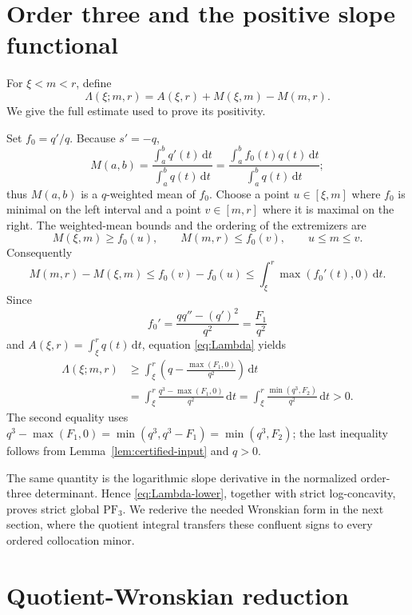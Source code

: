 \documentclass[11pt]{article}
\theoremstyle{remark}
\newcommand{\dd}{\,\mathrm{d}}
\newcommand{\PF}{\mathrm{PF}}
\numberwithin{equation}{section}
\begin{document}
\section{Order three and the positive slope functional}\label{sec:pf3}

For \(\xi<m<r\), define
\begin{equation}\label{eq:Lambda}
 \Lambda(\xi;m,r)=A(\xi,r)+M(\xi,m)-M(m,r).
\end{equation}
We give the full estimate used to prove its positivity.

Set \(f_0=q'/q\). Because \(s'=-q\),
\[
 M(a,b)=\frac{\int_a^bq'(t)\dd t}{\int_a^bq(t)\dd t}
       =\frac{\int_a^b f_0(t)q(t)\dd t}{\int_a^bq(t)\dd t};
\]
thus \(M(a,b)\) is a \(q\)-weighted mean of \(f_0\). Choose a point
\(u\in[\xi,m]\) where \(f_0\) is minimal on the left interval and a point
\(v\in[m,r]\) where it is maximal on the right. The weighted-mean bounds and
the ordering of the extremizers are
\[
 M(\xi,m)\geq f_0(u),\qquad M(m,r)\leq f_0(v),
 \qquad u\leq m\leq v.
\]
Consequently
\[
 M(m,r)-M(\xi,m)\leq f_0(v)-f_0(u)
 \leq\int_\xi^r\max(f_0'(t),0)\dd t.
\]
Since
\[
 f_0'=\frac{qq''-(q')^2}{q^2}=\frac{F_1}{q^2}
\]
and \(A(\xi,r)=\int_\xi^r q(t)\dd t\), equation
\eqref{eq:Lambda} yields
\begin{align}
 \Lambda(\xi;m,r)
 &\geq\int_\xi^r\left(q-\frac{\max(F_1,0)}{q^2}\right)\dd t\\
 &=\int_\xi^r\frac{q^3-\max(F_1,0)}{q^2}\dd t
 =\int_\xi^r\frac{\min(q^3,F_2)}{q^2}\dd t>0.
 \label{eq:Lambda-lower}
\end{align}
The second equality uses
\(q^3-\max(F_1,0)=\min(q^3,q^3-F_1)=\min(q^3,F_2)\); the last inequality
follows from Lemma~\ref{lem:certified-input} and \(q>0\).

The same quantity is the logarithmic slope derivative in the normalized
order-three determinant. Hence \eqref{eq:Lambda-lower}, together with strict
log-concavity, proves strict global \(\PF_3\). We rederive the needed
Wronskian form in the next section, where the quotient integral transfers
these confluent signs to every ordered collocation minor.
\section{Quotient-Wronskian reduction}\label{sec:quotient}
\end{document}
